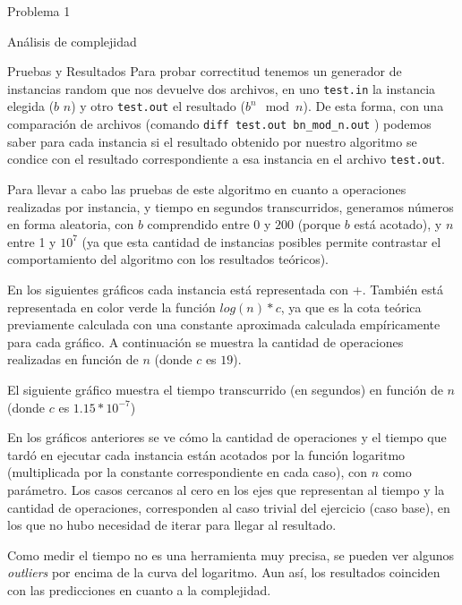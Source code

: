 \begin{section}{Problema 1}
\begin{subsection}{Análisis de complejidad}
	\end{subsection}
	\begin{subsection}{Pruebas y Resultados}
		Para probar correctitud tenemos un generador de instancias random que nos devuelve dos archivos, en uno \texttt{test.in} la instancia elegida ($b$ $n$) y otro \texttt{test.out} el resultado ($b^n \mod n$). De esta forma, con una comparación de archivos (comando \texttt{diff test.out bn\_mod\_n.out} ) podemos saber para cada instancia si el resultado obtenido por nuestro algoritmo se condice con el resultado correspondiente a esa instancia en el archivo \texttt{test.out}.
		
		Para llevar a cabo las pruebas de este algoritmo en cuanto a operaciones realizadas por instancia, y tiempo en segundos transcurridos, generamos números en forma aleatoria, con $b$ comprendido entre $0$ y $200$ (porque $b$ está acotado), y $n$ entre 1 y $10^7$ (ya que esta cantidad de instancias posibles permite contrastar el comportamiento del algoritmo con los resultados teóricos).

En los siguientes gráficos cada instancia está representada con {\color{red}+}. También está representada en color verde la función $log(n)*c$, ya que es la cota teórica previamente calculada con una constante aproximada calculada empíricamente para cada gráfico. A continuación se muestra la cantidad de operaciones realizadas en función de $n$ (donde $c$ es $19$).\VSP

		\VSP
		
		\newpage

El siguiente gráfico muestra el tiempo transcurrido (en segundos) en función de $n$ (donde $c$ es $1.15*10^{-7}$)\VSP


En los gráficos anteriores se ve cómo la cantidad de operaciones y el tiempo que tardó en ejecutar cada instancia están acotados por la función logaritmo (multiplicada por la constante correspondiente en cada caso), con $n$ como parámetro. Los casos cercanos al cero en los ejes que representan al tiempo y la cantidad de operaciones, co\-rres\-pon\-den al caso trivial del ejercicio (caso base), en los que no hubo necesidad de iterar para llegar al resultado.

		Como medir el tiempo no es una herramienta muy precisa, se pueden ver algunos {\em outliers} por encima de la curva del logaritmo. Aun así, los resultados coinciden con las predicciones en cuanto a la complejidad.\Pa


\end{subsection}
\end{section}
